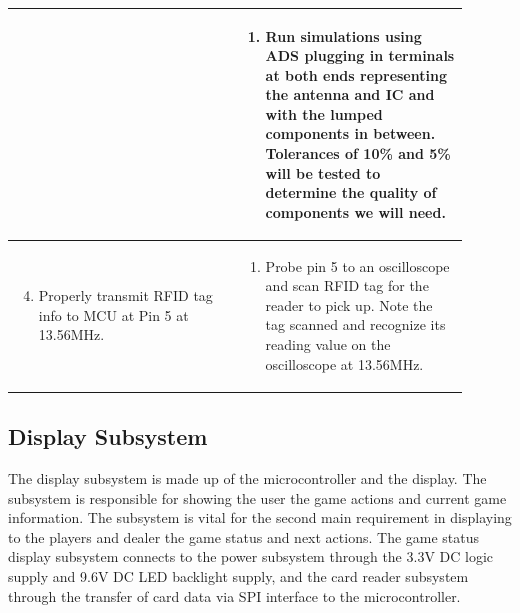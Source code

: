 \documentclass[12pt]{article}
\begin{document}
\begin{table}[!h]
\begin{tabular}{| p{0.45\linewidth} | p{0.45\linewidth} |}
\begin{enumerate}
		\end{enumerate} & \begin{enumerate}[label=\alph*)]
 			\item Run simulations using ADS plugging in terminals at both ends representing the antenna and IC and with the lumped components in between. Tolerances of 10\% and 5\% will be tested to determine the quality of components we will need.
		\end{enumerate} \\
		\hline
		\begin{enumerate}
		\setcounter{enumi}{3}
 			\item Properly transmit RFID tag info to MCU at Pin 5 at 13.56MHz.
		\end{enumerate} & \begin{enumerate}[label=\alph*)]
 			\item Probe pin 5 to an oscilloscope and scan RFID tag for the reader to pick up. Note the tag scanned and recognize its reading value on the oscilloscope at 13.56MHz.
		\end{enumerate} \\
		\hline
	\end{tabular}
\end{table}

\subsection{Display Subsystem}

The display subsystem is made up of the microcontroller and the display. The subsystem is responsible for showing the user the game actions and current game information. The subsystem is vital for the second main requirement in displaying to the players and dealer the game status and next actions. The game status display subsystem connects to the power subsystem through the 3.3V DC logic supply and 9.6V DC LED backlight supply, and the card reader subsystem through the transfer of card data via SPI interface to the microcontroller.
\end{document}
